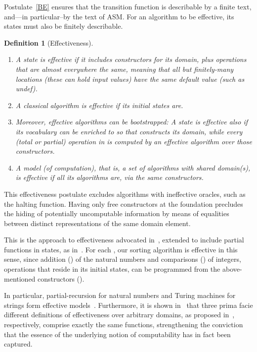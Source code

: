 \documentclass[copyright,creativecommons,english]{eptcs}
\newcommand{\Undef}{\textsf{undef}}
\newtheorem{definition}[theorem]{Definition}
\begin{document}
Postulate~\ref{BE} ensures that the transition function is describable by a finite text, and---in particular--by the text of ASM.
For an algorithm to be effective, its states must also be finitely describable.

\begin{definition}[Effectiveness]\ 
\begin{enumerate}
\item A state is \emph{effective} if it includes
constructors for its domain,
plus operations that are almost everywhere the same,
meaning that all but finitely-many locations (these can hold input values) have the same default value (such as \Undef\/).
\item A classical algorithm is \emph{effective} if its initial states are.
\item Moreover, effective algorithms can be bootstrapped: 
A state is effective also if its vocabulary can be enriched to
 so that  constructs its domain, while
every (total or partial) operation in  is computed by an effective algorithm over those constructors.
\item A \emph{model (of computation)}, that is, a set of algorithms with shared domain(s), is \emph{effective} if all its algorithms are, via the \emph{same} constructors.
\end{enumerate}
\end{definition}

This effectiveness postulate excludes algorithms with ineffective oracles, such as the halting function.
Having only free constructors at the foundation precludes the hiding of potentially uncomputable information by means of equalities between distinct representations of the same domain element.

This is the approach to effectiveness advocated in~\cite{CTT}, extended
to include partial functions in states, as in~\cite{Exact}.
For each , our sorting algorithm is effective in this sense,
since addition () of the natural numbers and comparisons () of integers, operations that reside in its initial states, can be programmed from the above-mentioned constructors ().

In particular, partial-recursion for natural numbers and Turing machines for strings form effective models~\cite{CTT}.
Furthermore, it is shown in~\cite{Three}
that three prima facie different definitions of effectiveness over arbitrary domains, as proposed in~\cite{CTT,CT,ComputableKernel}, respectively,
comprise exactly the same functions,
strengthening the conviction that the essence of the underlying notion of computability has in fact been captured.
\end{document}
